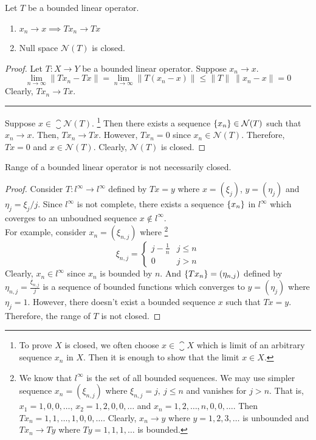 \begin{corollary}
	Let $T$ be a bounded linear operator.
	\begin{enumerate}
		\item $x_n \to x \implies Tx_n \to Tx$
		\item Null space $\mathcal{N}(T)$ is closed.
	\end{enumerate}
\end{corollary}
\begin{proof}
	Let $T : X \to Y$ be a bounded linear operator.
	Suppose $x_n \to x$.
	\[ \lim_{n \to \infty} \|Tx_n - Tx\| = \lim_{n \to \infty} \|T(x_n-x)\| \le \|T\| \ \|x_n-x\| = 0 \]
	Clearly, $Tx_n \to Tx$.\\

	\hrule \vspace{1em}

	Suppose $x \in \closure{\mathcal{N}(T)}$.
	\dag\footnote{
		To prove $X$ is closed, we often choose $x \in \closure{X}$ which is limit of an arbitrary sequence $x_n$ in $X$.
		Then it is enough to show that the limit $x \in X$.}
	Then there exists a sequence $\left\{x_n\right\} \in \mathcal{N}(T)$ such that $x_n \to x$.
	Then, $Tx_n \to Tx$.
	However, $Tx_n = 0$ since $x_n \in \mathcal{N}(T)$.
	Therefore, $Tx = 0$ and $x \in \mathcal{N}(T)$.
	Clearly, $\mathcal{N}(T)$ is closed.
\end{proof}

\begin{remark}
	Range of a bounded linear operator is not necessarily closed.
\end{remark}
\begin{proof}
	Consider $T : l^\infty \to l^\infty$ defined by $Tx = y$ where $x = (\xi_j)$, $y = (\eta_j)$ and $\eta_j = \xi_j/j$.
	Since $l^\infty$ is not complete, there exists a sequence $\left\{x_n\right\}$ in $l^\infty$ which coverges to an unboudned sequence $x \notin l^\infty$.\\

	For example, consider $x_n = (\xi_{n,j})$ where\dag
	\footnote{
		We know that $l^\infty$ is the set of all bounded sequences.
		We may use simpler sequence $x_n = (\xi_{n,j})$ where $\xi_{n,j} = j,\ j \le n$ and vanishes for $j >n$.
		That is, $x_1 = 1,0,0,\dots$, $x_2 = 1,2,0,0,\dots$ and $x_n = 1,2,\dots,n,0,0,\dots$.
		Then $Tx_n = 1,1,\dots,1,0,0,\dots$.
		Clearly, $x_n \to y$ where $y = 1,2,3,\dots$ is unbounded and $Tx_n \to Ty$ where $Ty = 1,1,1,\dots$ is bounded.}
	\[\xi_{n,j} = \begin{cases} j-\frac{1}{n} & j \le n \\ 0 & j > n \end{cases} \]
	Clearly, $x_n \in l^\infty$ since $x_n$ is bounded by $n$.
	And $\left\{Tx_n\right\} = (\eta_{n,j})$ defined by $\eta_{n,j} =\frac{\xi_{n,j}}{j}$ is a sequence of bounded functions which converges to $y= (\eta_j)$ where $\eta_j = 1$.
	However, there doesn't exist a bounded sequence $x$ such that $Tx = y$.
	Therefore, the range of $T$ is not closed.
\end{proof}

